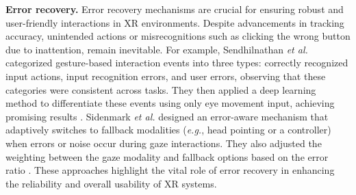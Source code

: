 \documentclass[review]{fcs}
\newcommand{\ccite}{\textcolor[rgb]{0,0,1}{[cite]}}
\begin{document}
\textbf{Error recovery.} Error recovery mechanisms are crucial for ensuring robust and user-friendly interactions in XR environments. Despite advancements in tracking accuracy, unintended actions or misrecognitions such as clicking the wrong button due to inattention, remain inevitable. 
For example, Sendhilnathan \textit{et al.} categorized gesture-based interaction events into three types: correctly recognized input actions, input recognition errors, and user errors, observing that these categories were consistent across tasks. They then applied a deep learning method to differentiate these events using only eye movement input, achieving promising results \cite{DBLP:conf/uist/SendhilnathanZL22}.
Sidenmark \textit{et al.} designed an error-aware mechanism that adaptively switches to fallback modalities (\textit{e.g.}, head pointing or a controller) when errors or noise occur during gaze interactions. They also adjusted the weighting between the gaze modality and fallback options based on the error ratio \cite{DBLP:journals/tvcg/SidenmarkP0CGWG22}. These approaches highlight the vital role of error recovery in enhancing the reliability and overall usability of XR systems.






\end{document}

